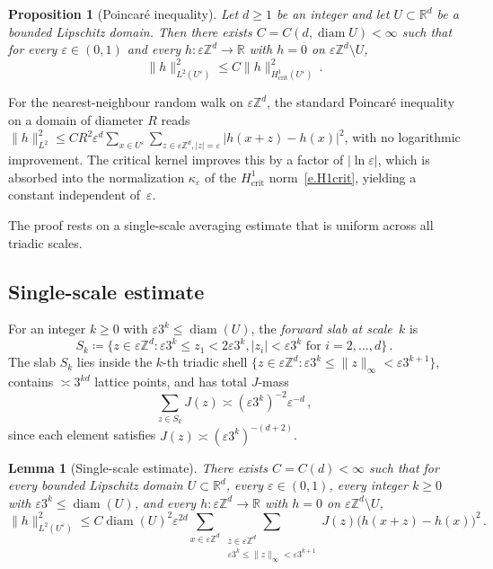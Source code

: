 \documentclass[11pt]{amsart}
\theoremstyle{plain}
\newtheorem{proposition}[theorem]{Proposition}
\newtheorem{lemma}[theorem]{Lemma}
\theoremstyle{definition}
\theoremstyle{remark}
\newcommand{\Zd}{\mathbb{Z}^d}
\newcommand{\Rd}{\mathbb{R}^d}
\newcommand{\R}{\mathbb{R}}
\newcommand{\eps}{\varepsilon}
\begin{document}
	\begin{proposition}[Poincar\'e inequality]
		\label{p.poincare}
		Let $d \ge 1$ be an integer and let $U \subset \Rd$ be a bounded Lipschitz domain.
		Then there exists $C = C(d, \operatorname{diam} U) < \infty$ such that for every $\eps \in (0,1)$ and every $h \colon \eps\Zd \to \R$ with $h = 0$ on $\eps\Zd \setminus U$,
		\begin{equation}
			\label{e.poincare}
			\|h\|_{L^2(U^\eps)}^2
			\le C \|h\|_{H^1_{\mathrm{crit}}(U^\eps)}^2\,.
		\end{equation}
	\end{proposition}
	For the nearest-neighbour random walk on $\eps\Zd$, the standard Poincar\'e inequality on a domain of diameter $R$ reads $\|h\|_{L^2}^2 \le CR^2 \eps^d \sum_{x \in U^\eps} \sum_{z \in \eps\Zd, |z|=\eps} |h(x+z) - h(x)|^2$, with no logarithmic improvement. The critical kernel improves this by a factor of $|\ln\eps|$, which is absorbed into the normalization $\kappa_\eps$ of the $H^1_{\mathrm{crit}}$ norm~\eqref{e.H1crit}, yielding a constant independent of~$\eps$.
	
	The proof rests on a single-scale averaging estimate that is uniform across all triadic scales.
	
	\subsection{Single-scale estimate}
	
	For an integer $k \ge 0$ with $\eps 3^k \le \operatorname{diam}(U)$, the \emph{forward slab at scale~$k$} is
	\begin{equation}
		\label{e.Sk}
		S_k \coloneqq \bigl\{z \in \eps\Zd : \eps 3^k \le z_1 < 2\eps 3^k, |z_i| < \eps 3^k \text{ for } i = 2, \ldots, d\bigr\}\,.
	\end{equation}
	The slab $S_k$ lies inside the $k$-th triadic shell $\{z \in \eps\Zd : \eps 3^k \le \|z\|_\infty < \eps 3^{k+1}\}$, contains $\asymp 3^{kd}$ lattice points, and has total $J$-mass
	\begin{equation}
		\label{e.slab.mass}
		\sum_{z \in S_k} J(z) \asymp (\eps 3^k)^{-2} \eps^{-d}\,,
	\end{equation}
	since each element satisfies $J(z) \asymp (\eps 3^k)^{-(d+2)}$.
	
	\begin{lemma}[Single-scale estimate]
		\label{l.single.scale}
		There exists $C = C(d) < \infty$ such that for every bounded Lipschitz domain $U \subset \Rd$, every $\eps \in (0,1)$, every integer $k \ge 0$ with $\eps 3^k \le \operatorname{diam}(U)$, and every $h \colon \eps\Zd \to \R$ with $h = 0$ on $\eps\Zd \setminus U$,
		\begin{equation}
			\label{e.single.scale}
			\|h\|_{L^2(U^\eps)}^2
			\le
			C \operatorname{diam}(U)^2
			\eps^{2d}
			\sum_{x \in \eps\Zd}
			\sum_{\substack{z \in \eps\Zd \\ \eps 3^k \le \|z\|_\infty < \eps 3^{k+1}}}
			J(z)\bigl(h(x{+}z) - h(x)\bigr)^2\,.
		\end{equation}
	\end{lemma}
	
\end{document}
